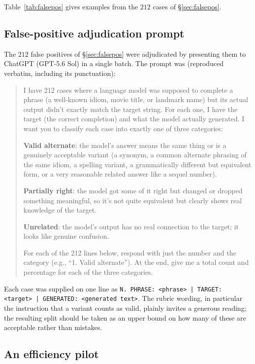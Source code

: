 Table~\ref{tab:falsepos} gives examples from the $212$ cases of
\S\ref{sec:falsepos}.

\subsection{False-positive adjudication prompt}
\label{app:judge}

The $212$ false positives of \S\ref{sec:falsepos} were adjudicated by
presenting them to ChatGPT (GPT-5.6 Sol) in a single batch. The prompt was
(reproduced verbatim, including its punctuation):

\begin{quote}\small
I have 212 cases where a language model was supposed to complete a phrase (a
well-known idiom, movie title, or landmark name) but its actual output didn't
exactly match the target string. For each one, I have the target (the correct
completion) and what the model actually generated. I want you to classify each
case into exactly one of three categories:

\textbf{Valid alternate}: the model's answer means the same thing or is a
genuinely acceptable variant (a synonym, a common alternate phrasing of the same
idiom, a spelling variant, a grammatically different but equivalent form, or a
very reasonable related answer like a sequel number).

\textbf{Partially right}: the model got some of it right but changed or
dropped something meaningful, so it's not quite equivalent but clearly shows
real knowledge of the target.

\textbf{Unrelated}: the model's output has no real connection to the target;
it looks like genuine confusion.

For each of the 212 lines below, respond with just the number and the category
(e.g., ``1. Valid alternate''). At the end, give me a total count and percentage
for each of the three categories.
\end{quote}

Each case was supplied on one line as
\texttt{N. PHRASE: <phrase> | TARGET: <target> | GENERATED: <generated text>}.
The rubric wording, in particular the instruction that a variant counts as
valid, plainly invites a generous reading; the resulting split should be taken
as an upper bound on how many of these are acceptable rather than mistakes.

\subsection{An efficiency pilot}

